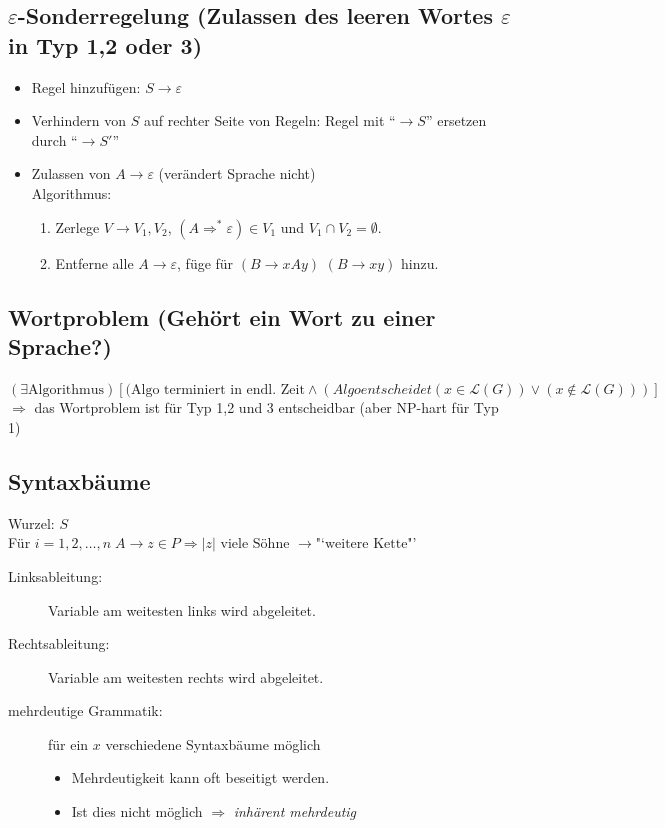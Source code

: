\documentclass{scrartcl}
\begin{document}
\subsection*{$\varepsilon$-Sonderregelung {\tiny (Zulassen des leeren Wortes $\varepsilon$ in Typ 1,2 oder 3)}}
\begin{itemize}
\item Regel hinzufügen: $S\to\varepsilon$
\item Verhindern von $S$ auf rechter Seite von Regeln: Regel mit "`$\to S$"' ersetzen durch "`$\to S'$"'
\item Zulassen von $A\to\varepsilon$ {\tiny (verändert Sprache nicht)}\\
Algorithmus:
\begin{enumerate}
\item Zerlege $V\to V_1,V_2$, $(A\Rightarrow^*\varepsilon)\in V_1$ und $V_1\cap V_2=\emptyset$.
\item Entferne alle $A\to\varepsilon$, füge für $(B\to xAy)$ $(B\to xy)$ hinzu.
\end{enumerate}
\end{itemize}

\subsection*{Wortproblem {\tiny (Gehört ein Wort zu einer Sprache?)}}
$(\exists \textrm{Algorithmus})[(\textrm{Algo terminiert in endl. Zeit}\wedge(Algo entscheidet (x\in\mathcal{L}(G))\vee(x\not\in\mathcal{L}(G)))]$ \\
$\Rightarrow$ das Wortproblem ist für Typ 1,2 und 3 entscheidbar (aber NP-hart für Typ 1)

\subsection*{Syntaxbäume}
Wurzel: $S$ \\
Für $i=1,2,\ldots,n\; A\to z\in P\Rightarrow\vert z\vert\textrm{ viele Söhne }\to \textrm{"`weitere Kette"'}$\\
\begin{description}
\item[Linksableitung:] Variable am weitesten links wird abgeleitet.
\item[Rechtsableitung:] Variable am weitesten rechts wird abgeleitet.
\item[mehrdeutige Grammatik:] für ein $x$ verschiedene Syntaxbäume möglich
	\begin{itemize}
	\item Mehrdeutigkeit kann oft beseitigt werden.
	\item Ist dies nicht möglich $\Rightarrow$ \emph{inhärent mehrdeutig}
	\end{itemize}
\end{description}
\end{document}
